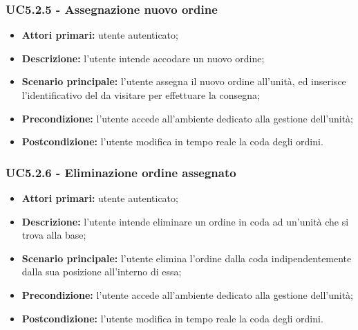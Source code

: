         \subsubsection{UC5.2.5 - Assegnazione nuovo ordine}
        \begin{itemize}
            \item \textbf{Attori primari:} utente autenticato;
            \item \textbf{Descrizione:} l'utente intende accodare un nuovo ordine;
            \item \textbf{Scenario principale:} l'utente assegna il nuovo ordine all'unità, ed inserisce l'identificativo del  da visitare per effettuare la consegna;
            \item \textbf{Precondizione:} l'utente accede all'ambiente dedicato alla gestione dell'unità;
            \item \textbf{Postcondizione:} l'utente modifica in tempo reale la coda degli ordini.
        \end{itemize}

        \subsubsection{UC5.2.6 - Eliminazione ordine assegnato}
        \begin{itemize}
            \item \textbf{Attori primari:} utente autenticato;
            \item \textbf{Descrizione:} l'utente intende eliminare un ordine in coda ad un'unità che si trova alla base;
            \item \textbf{Scenario principale:} l'utente elimina l'ordine dalla coda indipendentemente dalla sua posizione all'interno di essa;
            \item \textbf{Precondizione:} l'utente accede all'ambiente dedicato alla gestione dell'unità;
            \item \textbf{Postcondizione:} l'utente modifica in tempo reale la coda degli ordini.
        \end{itemize}
